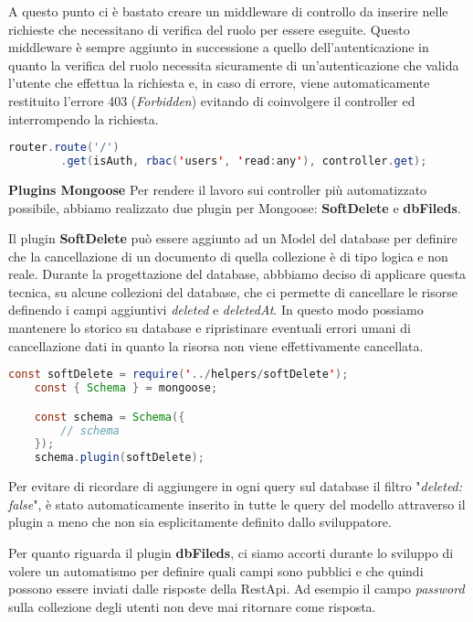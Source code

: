 A questo punto ci è bastato creare un middleware di controllo da inserire nelle richieste che necessitano di verifica del ruolo per essere eseguite.
Questo middleware è sempre aggiunto in successione a quello dell'autenticazione 
in quanto la verifica del ruolo necessita sicuramente di un'autenticazione che valida l'utente che effettua la richiesta e,
in caso di errore, viene automaticamente restituito l'errore 403 (\textit{Forbidden}) evitando di coinvolgere il controller ed interrompendo la richiesta.

\begin{lstlisting}[language=java]
	router.route('/')
		.get(isAuth, rbac('users', 'read:any'), controller.get);
\end{lstlisting}

\bigbreak
\noindent
\textbf{Plugins Mongoose}
\bigbreak
\noindent
Per rendere il lavoro sui controller più automatizzato possibile,
abbiamo realizzato due plugin per Mongoose: \textbf{SoftDelete} e \textbf{dbFileds}.

Il plugin \textbf{SoftDelete} può essere aggiunto ad un Model del database per definire che la cancellazione di un documento di quella collezione
è di tipo logica e non reale.
Durante la progettazione del database, abbbiamo deciso di applicare questa tecnica, su alcune collezioni del database,
che ci permette di cancellare le risorse definendo i campi aggiuntivi \textit{deleted} e \textit{deletedAt}. 
In questo modo possiamo mantenere lo storico su database e ripristinare eventuali errori umani di cancellazione dati
in quanto la risorsa non viene effettivamente cancellata.

\begin{lstlisting}[language=java]
	const softDelete = require('../helpers/softDelete');
	const { Schema } = mongoose;

	const schema = Schema({
		// schema
	});
	schema.plugin(softDelete);
\end{lstlisting}

Per evitare di ricordare di aggiungere in ogni query sul database il filtro "\textit{deleted: false}",
è stato automaticamente inserito in tutte le query del modello attraverso il plugin
a meno che non sia esplicitamente definito dallo sviluppatore.

Per quanto riguarda il plugin \textbf{dbFileds}, ci siamo accorti durante lo sviluppo di volere un automatismo per definire quali campi sono pubblici 
e che quindi possono essere inviati dalle risposte della RestApi. 
Ad esempio il campo \textit{password} sulla collezione degli utenti non deve mai ritornare come risposta.

